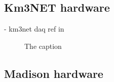 \subsection{Km3NET hardware} %
\label{sec:daq_hard_km3net} %

- km3net daq ref in~\cite{biagi2015, adrian2016, eijk2015}

\begin{figure} %
    \centering
    \quad
    \caption[The caption]
    {The caption}
\end{figure}

\subsection{Madison hardware} %
\label{sec:daq_hard_madison} %

